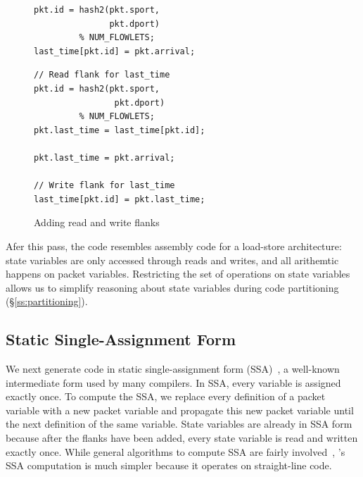 \begin{figure}[!h]
  \begin{minipage}{0.47\columnwidth}
  \begin{small}
  \begin{lstlisting}[style=customc]
pkt.id = hash2(pkt.sport,
               pkt.dport)
         % NUM_FLOWLETS;
last_time[pkt.id] = pkt.arrival;
  \end{lstlisting}
  \end{small}
  \end{minipage}
  \begin{minipage}{0.53\columnwidth}
  \begin{small}
  \begin{lstlisting}[style=customc]
// Read flank for last_time
pkt.id = hash2(pkt.sport,
                pkt.dport)
         % NUM_FLOWLETS;
pkt.last_time = last_time[pkt.id];

pkt.last_time = pkt.arrival;

// Write flank for last_time
last_time[pkt.id] = pkt.last_time;
  \end{lstlisting}
  \end{small}
  \end{minipage}
  \caption{Adding read and write flanks}
\label{fig:stateful_flanks}
\end{figure}

Afer this pass, the code resembles assembly code for a load-store architecture:
state variables are only accessed through reads and writes, and all arithemtic
happens on packet variables. Restricting the set of operations on state
variables allows us to simplify reasoning about state variables during code
partitioning (\S\ref{ss:partitioning}).

\subsection{Static Single-Assignment Form}
We next generate code in static single-assignment form
(SSA)~\cite{ferrante_ssa}, a well-known intermediate form used by many
compilers. In SSA, every variable is assigned exactly once. To compute the SSA,
we replace every definition of a packet variable with a new packet variable and
propagate this new packet variable until the next definition of the same
variable. State variables are already in SSA form because after the flanks have been
added, every state variable is read and written exactly once.
While general algorithms to compute SSA are fairly
involved~\cite{postdominator}, \pktlanguage's SSA computation is much simpler
because it operates on straight-line code.


